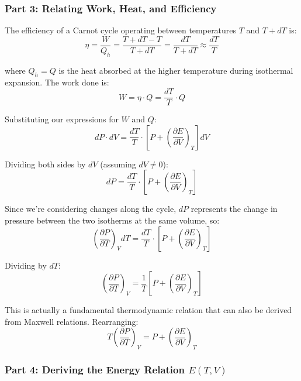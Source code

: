 \documentclass[10pt,twocoloumn]{article}
\begin{document}
\subsubsection*{Part 3: Relating Work, Heat, and Efficiency}

The efficiency of a Carnot cycle operating between temperatures $T$ and $T + dT$ is:
\begin{equation}\eta = \frac{W}{Q_h} = \frac{T + dT - T}{T + dT} = \frac{dT}{T + dT} \approx \frac{dT}{T}\end{equation}

where $Q_h = Q$ is the heat absorbed at the higher temperature during isothermal expansion. The work done is:
\begin{equation}W = \eta \cdot Q = \frac{dT}{T} \cdot Q\end{equation}

Substituting our expressions for $W$ and $Q$:
\begin{equation}dP \cdot dV = \frac{dT}{T} \cdot \left[P + \left(\frac{\partial E}{\partial V}\right)_T\right] dV\end{equation}

Dividing both sides by $dV$ (assuming $dV \neq 0$):
\begin{equation}dP = \frac{dT}{T} \cdot \left[P + \left(\frac{\partial E}{\partial V}\right)_T\right]\end{equation}

Since we're considering changes along the cycle, $dP$ represents the change in pressure between the two isotherms at the same volume, so:
\begin{equation}\left(\frac{\partial P}{\partial T}\right)_V dT = \frac{dT}{T} \cdot \left[P + \left(\frac{\partial E}{\partial V}\right)_T\right]\end{equation}

Dividing by $dT$:
\begin{equation}\boxed{\left(\frac{\partial P}{\partial T}\right)_V = \frac{1}{T}\left[P + \left(\frac{\partial E}{\partial V}\right)_T\right]}\end{equation}

This is actually a fundamental thermodynamic relation that can also be derived from Maxwell relations. Rearranging:
\begin{equation}T\left(\frac{\partial P}{\partial T}\right)_V = P + \left(\frac{\partial E}{\partial V}\right)_T\end{equation}

\subsubsection*{Part 4: Deriving the Energy Relation $E(T,V)$}
\end{document}
